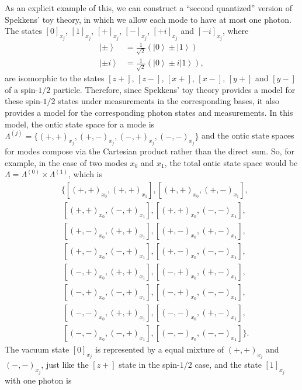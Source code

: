 \documentclass[DIV=calc,paper=a4,fontsize=11pt,twocolumn]{scrartcl} %
\theoremstyle{definition}
\theoremstyle{plain}
\newcommand{\Ket}[1]{\ensuremath{\left \vert #1 \right \rangle}}
\newcommand{\Proj}[1]{\ensuremath{\left [ #1 \right ]}}
\begin{document}
As an explicit example of this, we can construct a ``second
quantized'' version of Spekkens' toy theory, in which we allow each
mode to have at most one photon.  The states $\Proj{0}_{x_j}$,
$\Proj{1}_{x_j}$, $\Proj{+}_{x_j}$, $\Proj{-}_{x_j}$,
$\Proj{+i}_{x_j}$ and $\Proj{-i}_{x_j}$, where
\begin{align}
\Ket{\pm} & = \frac{1}{\sqrt{2}} \left (\Ket{0} \pm \Ket{1} \right ) \\
\Ket{\pm i} & = \frac{1}{\sqrt{2}} \left (\Ket{0} \pm i\Ket{1} \right ),
\end{align}
are isomorphic to the states $\Proj{z+}$, $\Proj{z-}$, $\Proj{x+}$,
$\Proj{x-}$, $\Proj{y+}$ and $\Proj{y-}$ of a spin-$1/2$ particle.
Therefore, since Spekkens' toy theory provides a model for these
spin-$1/2$ states under measurements in the corresponding bases, it
also provides a model for the corresponding photon states and
measurements.  In this model, the ontic state space for a mode is
$\Lambda^{(j)} = \{(+,+)_{x_j},(+,-)_{x_j},(-,+)_{x_j},(-,-)_{x_j}\}$
and the ontic state spaces for modes compose via the Cartesian product
rather than the direct sum.  So, for example, in the case of two modes
$x_0$ and $x_1$, the total ontic state space would be $\Lambda =
\Lambda^{(0)} \times \Lambda^{(1)}$, which is
\begin{eqnarray}
&\{\left[(+,+)_{x_0},(+,+)_{x_1}\right], \left[(+,+)_{x_0},(+,-)_{x_1}\right],\nonumber\\
&~\left[(+,+)_{x_0},(-,+)_{x_1}\right], \left[(+,+)_{x_0},(-,-)_{x_1}\right], \nonumber\\
&~\left[(+,-)_{x_0},(+,+)_{x_1}\right], \left[(+,-)_{x_0},(+,-)_{x_1}\right],\nonumber\\
&~\left[(+,-)_{x_0},(-,+)_{x_1}\right],\left[(+,-)_{x_0},(-,-)_{x_1}\right],\nonumber\\
&~\left[(-,+)_{x_0},(+,+)_{x_1}\right], \left[(-,+)_{x_0},(+,-)_{x_1}\right],\nonumber\\
&~\left[(-,+)_{x_0},(-,+)_{x_1}\right],\left[(-,+)_{x_0},(-,-)_{x_1}\right],\nonumber\\
&~\left[(-,-)_{x_0},(+,+)_{x_1}\right],\left[(-,-)_{x_0},(+,-)_{x_1}\right],\nonumber\\
&~\left[(-,-)_{x_0},(-,+)_{x_1}\right],\left[(-,-)_{x_0},(-,-)_{x_1}\right] \}.
\end{eqnarray}
The vacuum state $\Proj{0}_{x_j}$ is represented by a equal mixture of
$(+,+)_{x_j}$ and $(-,-)_{x_j}$, just like the $\Proj{z+}$ state in
the spin-$1/2$ case, and the state $\Proj{1}_{x_j}$ with one photon is
\end{document}
